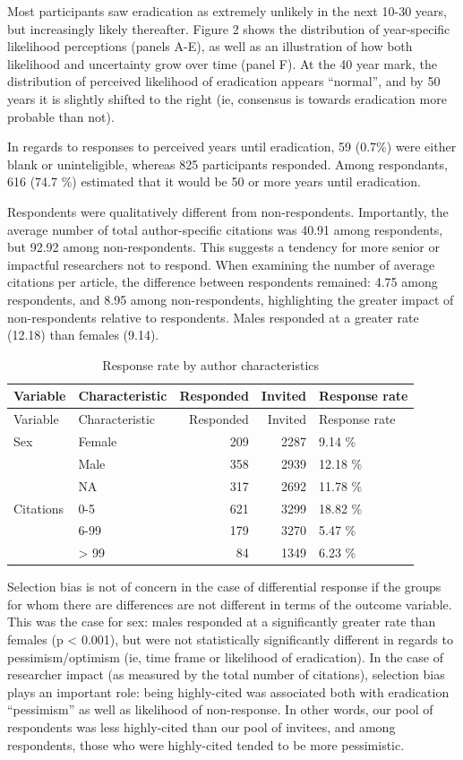 \documentclass[]{article}
\begin{document}
Most participants saw eradication as extremely unlikely in the next
10-30 years, but increasingly likely thereafter. Figure 2 shows the
distribution of year-specific likelihood perceptions (panels A-E), as
well as an illustration of how both likelihood and uncertainty grow over
time (panel F). At the 40 year mark, the distribution of perceived
likelihood of eradication appears ``normal'', and by 50 years it is
slightly shifted to the right (ie, consensus is towards eradication more
probable than not).

In regards to responses to perceived years until eradication, 59 (0.7\%)
were either blank or uninteligible, whereas 825 participants responded.
Among respondants, 616 (74.7 \%) estimated that it would be 50 or more
years until eradication.

Respondents were qualitatively different from non-respondents.
Importantly, the average number of total author-specific citations was
40.91 among respondents, but 92.92 among non-respondents. This suggests
a tendency for more senior or impactful researchers not to respond. When
examining the number of average citations per article, the difference
between respondents remained: 4.75 among respondents, and 8.95 among
non-respondents, highlighting the greater impact of non-respondents
relative to respondents. Males responded at a greater rate (12.18) than
females (9.14).

\begin{longtable}[]{@{}llrrl@{}}
\caption{Response rate by author characteristics}\tabularnewline
\toprule
Variable & Characteristic & Responded & Invited & Response
rate\tabularnewline
\midrule
\endfirsthead
\toprule
Variable & Characteristic & Responded & Invited & Response
rate\tabularnewline
\midrule
\endhead
Sex & Female & 209 & 2287 & 9.14 \%\tabularnewline
& Male & 358 & 2939 & 12.18 \%\tabularnewline
& NA & 317 & 2692 & 11.78 \%\tabularnewline
Citations & 0-5 & 621 & 3299 & 18.82 \%\tabularnewline
& 6-99 & 179 & 3270 & 5.47 \%\tabularnewline
& \textgreater{} 99 & 84 & 1349 & 6.23 \%\tabularnewline
\bottomrule
\end{longtable}

Selection bias is not of concern in the case of differential response if
the groups for whom there are differences are not different in terms of
the outcome variable. This was the case for sex: males responded at a
significantly greater rate than females (p \textless{} 0.001), but were
not statistically significantly different in regards to
pessimism/optimism (ie, time frame or likelihood of eradication). In the
case of researcher impact (as measured by the total number of
citations), selection bias plays an important role: being highly-cited
was associated both with eradication ``pessimism'' as well as likelihood
of non-response. In other words, our pool of respondents was less
highly-cited than our pool of invitees, and among respondents, those who
were highly-cited tended to be more pessimistic.
\end{document}
